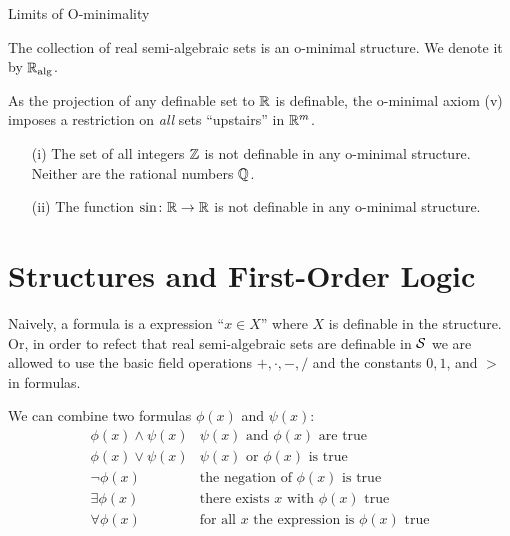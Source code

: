 \documentclass{beamer}
\begin{document}
\begin{frame}{Limits of O-minimality}
  \begin{theorem}
    The collection of real semi-algebraic sets is an o-minimal
    structure. We denote it by ${\mathbb{R}}_{\mathrm{alg}}$. 
  \end{theorem}

  As the projection of any definable set to ${\mathbb{R}}$ is definable, the
  o-minimal axiom (v) imposes a restriction on \emph{all} sets
  ``upstairs'' in ${\mathbb{R}}^m$.

  \begin{example}
    \begin{enumerate}
    \item [(i)] The set of all integers ${\mathbb{Z}}$ is \alert{not} definable in any
      o-minimal structure. Neither are the rational numbers ${\mathbb{Q}}$.
    \item[(ii)] The function $\sin \colon{\mathbb{R}}\rightarrow{\mathbb{R}}$ is
      \alert{not} definable in any o-minimal structure. 
    \end{enumerate}
  \end{example}
\end{frame}

\section{Structures and First-Order Logic}
\begin{frame}

  Naively, a formula is a expression ``$x\in X$'' where $X$ is definable
  in the structure.
  Or,   in order to refect that real semi-algebraic sets are definable in
  ${\mathcal S}$ we are allowed to use the basic field operations $+,\cdot,-,/$
  and the constants $0,1$, and $>$ in formulas.
  
  We can combine two formulas $\phi(x)$ and $\psi(x)$:
  \begin{equation*}
    \begin{array}{ll}
      \phi(x) \wedge \psi(x) & \text{$\psi(x)$ and $\phi(x)$ are true}\\
     \phi(x) \vee \psi(x) & \text{$\psi(x)$ or $\phi(x)$  is true}\\
     \neg \phi(x)  & \text{the negation of $\phi(x)$ is true}\\
     \exists \phi(x) &\text{there exists $x$ with $\phi(x)$ true}\\
     \forall \phi(x) &\text{for all $x$ the expression is $\phi(x)$ true}
    \end{array}
  \end{equation*}
\end{frame}
\end{document}
